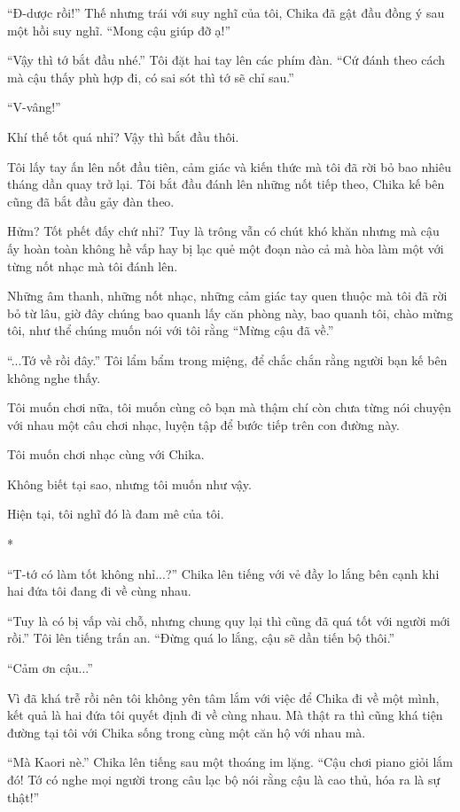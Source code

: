 {``Đ-dược rồi!'' Thế nhưng trái với suy nghĩ của tôi, Chika đã gật đầu
đồng ý sau một hồi suy nghĩ. ``Mong cậu giúp đỡ ạ!''

``Vậy thì tớ bắt đầu nhé.'' Tôi đặt hai tay lên các phím đàn. ``Cứ đánh
theo cách mà cậu thấy phù hợp đi, có sai sót thì tớ sẽ chỉ sau.''

``V-vâng!''

Khí thế tốt quá nhỉ? Vậy thì bắt đầu thôi.

Tôi lấy tay ấn lên nốt đầu tiên, cảm giác và kiến thức mà tôi đã rời bỏ
bao nhiêu tháng dần quay trở lại. Tôi bắt đầu đánh lên những nốt tiếp
theo, Chika kế bên cũng đã bắt đầu gảy đàn theo.

Hửm? Tốt phết đấy chứ nhỉ? Tuy là trông vẫn có chút khó khăn nhưng mà
cậu ấy hoàn toàn không hề vấp hay bị lạc quẻ một đoạn nào cả mà hòa làm
một với từng nốt nhạc mà tôi đánh lên.

Những âm thanh, những nốt nhạc, những cảm giác tay quen thuộc mà tôi đã
rời bỏ từ lâu, giờ đây chúng bao quanh lấy căn phòng này, bao quanh tôi,
chào mừng tôi, như thể chúng muốn nói với tôi rằng ``Mừng cậu đã về.''

``...Tớ về rồi đây.'' Tôi lẩm bẩm trong miệng, để chắc chắn rằng người
bạn kế bên không nghe thấy.

Tôi muốn chơi nữa, tôi muốn cùng cô bạn mà thậm chí còn chưa từng nói
chuyện với nhau một câu chơi nhạc, luyện tập để bước tiếp trên con đường
này.

Tôi muốn chơi nhạc cùng với Chika.

Không biết tại sao, nhưng tôi muốn như vậy.

Hiện tại, tôi nghĩ đó là đam mê của tôi.

*

``T-tớ có làm tốt không nhỉ...?'' Chika lên tiếng với vẻ đầy lo lắng bên
cạnh khi hai đứa tôi đang đi về cùng nhau.

``Tuy là có bị vấp vài chỗ, nhưng chung quy lại thì cũng đã quá tốt với
người mới rồi.'' Tôi lên tiếng trấn an. ``Đừng quá lo lắng, cậu sẽ dần
tiến bộ thôi.''

``Cảm ơn cậu...''

Vì đã khá trễ rồi nên tôi không yên tâm lắm với việc để Chika đi về một
mình, kết quả là hai đứa tôi quyết định đi về cùng nhau. Mà thật ra thì
cũng khá tiện đường tại tôi với Chika sống trong cùng một căn hộ với
nhau mà.

``Mà Kaori nè.'' Chika lên tiếng sau một thoáng im lặng. ``Cậu chơi
piano giỏi lắm đó! Tớ có nghe mọi người trong câu lạc bộ nói rằng cậu là
cao thủ, hóa ra là sự thật!''

}

